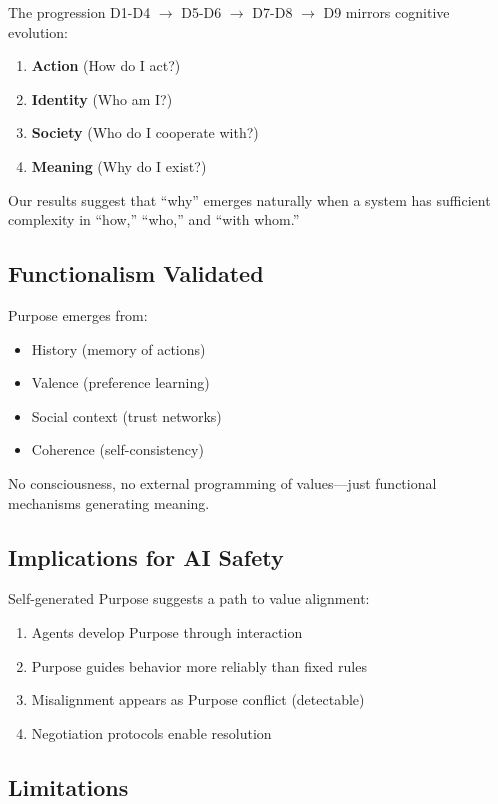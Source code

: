 \documentclass{article}
\begin{document}
The progression D1-D4 $\rightarrow$ D5-D6 $\rightarrow$ D7-D8 $\rightarrow$ D9 mirrors cognitive evolution:
\begin{enumerate}
    \item \textbf{Action} (How do I act?)
    \item \textbf{Identity} (Who am I?)
    \item \textbf{Society} (Who do I cooperate with?)
    \item \textbf{Meaning} (Why do I exist?)
\end{enumerate}

Our results suggest that ``why'' emerges naturally when a system has sufficient complexity in ``how,'' ``who,'' and ``with whom.''

\subsection{Functionalism Validated}

Purpose emerges from:
\begin{itemize}
    \item History (memory of actions)
    \item Valence (preference learning)
    \item Social context (trust networks)
    \item Coherence (self-consistency)
\end{itemize}

No consciousness, no external programming of values—just functional mechanisms generating meaning.

\subsection{Implications for AI Safety}

Self-generated Purpose suggests a path to value alignment:
\begin{enumerate}
    \item Agents develop Purpose through interaction
    \item Purpose guides behavior more reliably than fixed rules
    \item Misalignment appears as Purpose conflict (detectable)
    \item Negotiation protocols enable resolution
\end{enumerate}

\subsection{Limitations}
\end{document}
